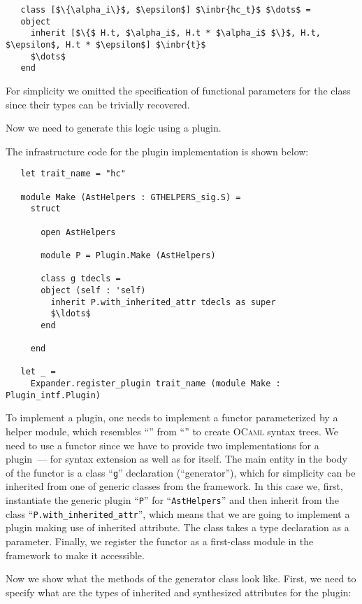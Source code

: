 \begin{lstlisting}
   class [$\{\alpha_i\}$, $\epsilon$] $\inbr{hc_t}$ $\dots$ =
   object
     inherit [$\{$ H.t, $\alpha_i$, H.t * $\alpha_i$ $\}$, H.t, $\epsilon$, H.t * $\epsilon$] $\inbr{t}$
     $\dots$
   end
\end{lstlisting}

For simplicity we omitted the specification of functional parameters for the class since their types can be trivially
recovered.

Now we need to generate this logic using a plugin.

The infrastructure code for the plugin implementation is shown below:

\begin{lstlisting}
   let trait_name = "hc"
  
   module Make (AstHelpers : GTHELPERS_sig.S) =
     struct
     
       open AstHelpers

       module P = Plugin.Make (AstHelpers)

       class g tdecls =
       object (self : 'self)
         inherit P.with_inherited_attr tdecls as super
         $\ldots$
       end

     end

   let _ =
     Expander.register_plugin trait_name (module Make : Plugin_intf.Plugin)
\end{lstlisting}

To implement a plugin, one needs to implement a functor parameterized by a helper module, which resembles ``'' from
``'' to create \textsc{OCaml} syntax trees. We need to use a functor since we have to provide two implementations for
a plugin~--- for  syntax extension as well as for  itself. The main entity in the body of the functor is
a class ``\lstinline{g}'' declaration (``generator''), which for simplicity can be inherited from one of generic classes 
from the framework. In this case we, first, instantiate the generic plugin ``\lstinline{P}'' for ``\lstinline{AstHelpers}'' and
then inherit from the class ``\lstinline{P.with_inherited_attr}'', which means that we are going to implement a plugin
making use of inherited attribute. The class takes a type declaration as a parameter. Finally, we register the functor as a
first-class module in the framework to make it accessible.

Now we show what the methods of the generator class look like. First, we need to specify what are the types of inherited and
synthesized attributes for the plugin:

